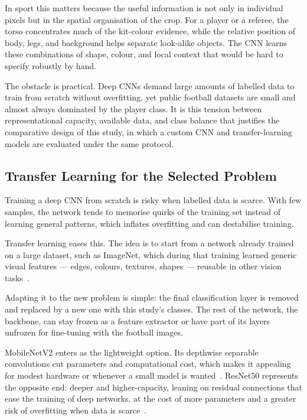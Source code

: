 \documentclass[preprint,12pt]{elsarticle}
\begin{document}
In sport this matters because the useful information is not only in individual pixels but in the spatial organisation of the crop. For a player or a referee, the torso concentrates much of the kit-colour evidence, while the relative position of body, legs, and background helps separate look-alike objects. The CNN learns these combinations of shape, colour, and local context that would be hard to specify robustly by hand.

The obstacle is practical. Deep CNNs demand large amounts of labelled data to train from scratch without overfitting, yet public football datasets are small and almost always dominated by the player class. It is this tension between representational capacity, available data, and class balance that justifies the comparative design of this study, in which a custom CNN and transfer-learning models are evaluated under the same protocol.

\subsection{Transfer Learning for the Selected Problem}
Training a deep CNN from scratch is risky when labelled data is scarce. With few samples, the network tends to memorise quirks of the training set instead of learning general patterns, which inflates overfitting and can destabilise training.

Transfer learning eases this. The idea is to start from a network already trained on a large dataset, such as ImageNet, which during that training learned generic visual features --- edges, colours, textures, shapes --- reusable in other vision tasks~\cite{deng2009imagenet}.

Adapting it to the new problem is simple: the final classification layer is removed and replaced by a new one with this study's classes. The rest of the network, the backbone, can stay frozen as a feature extractor or have part of its layers unfrozen for fine-tuning with the football images.

MobileNetV2 enters as the lightweight option. Its depthwise separable convolutions cut parameters and computational cost, which makes it appealing for modest hardware or whenever a small model is wanted~\cite{sandler2018mobilenetv2,martins2025mobilenet}. ResNet50 represents the opposite end: deeper and higher-capacity, leaning on residual connections that ease the training of deep networks, at the cost of more parameters and a greater risk of overfitting when data is scarce~\cite{he2016deep}.
\end{document}
